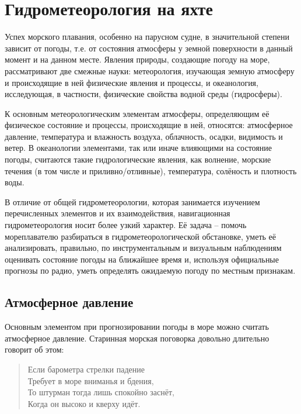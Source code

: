 \twocolumn

\chapter{Гидрометеорология на яхте}\label{chap:8}

Успех морского плавания, особенно на парусном судне, в значительной
степени зависит от погоды, т.е. от состояния атмосферы у земной
поверхности в данный момент и на данном месте. Явления природы,
создающие погоду на море, рассматривают две смежные науки:
метеорология, изучающая земную атмосферу и происходящие в ней
физические явления и процессы, и океанология, исследующая, в
частности, физические свойства водной среды (гидросферы).

К основным метеорологическим элементам атмосферы, определяющим её
физическое состояние и процессы, происходящие в ней, относятся:
атмосферное давление, температура и влажность воздуха, облачность,
осадки, видимость и ветер. В океанологии элементами, так или иначе
влияющими на состояние погоды, считаются такие гидрологические
явления, как волнение, морские течения (в том числе и
приливно\-/отливные), температура, солёность и плотность воды.

В отличие от общей гидрометеорологии, которая занимается изучением
перечисленных элементов и их взаимодействия, навигационная
гидрометеорология носит более узкий характер. Её задача \--- помочь
мореплавателю разбираться в гидрометеорологической обстановке, уметь
её анализировать, правильно, по инструментальным и визуальным
наблюдениям оценивать состояние погоды на ближайшее время и, используя
официальные прогнозы по радио, уметь определять ожидаемую погоду по
местным признакам.

\section{Атмосферное давление}

Основным элементом при прогнозировании погоды в море можно считать
атмосферное давление. Старинная морская поговорка довольно длительно
говорит об этом:

\begin{quote}
Если барометра стрелки падение \\
Требует в море вниманья и бдения, \\
То штурман тогда лишь спокойно заснёт, \\
Когда он высоко и кверху идёт. \\
\end{quote}

